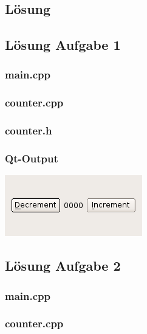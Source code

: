 \setcounter{section}{12}
\setcounter{subsection}{1}

\subsection{Lösung}
\subsection{Lösung Aufgabe 1}
\subsubsection{main.cpp}

\subsubsection{counter.cpp}

\subsubsection{counter.h}

\subsubsection{Qt-Output}
\begin{center}
	\includegraphics[scale=.5]{./images/u12a1.png}
\end{center}

\subsection{Lösung Aufgabe 2}
\subsubsection{main.cpp}

\subsubsection{counter.cpp}

